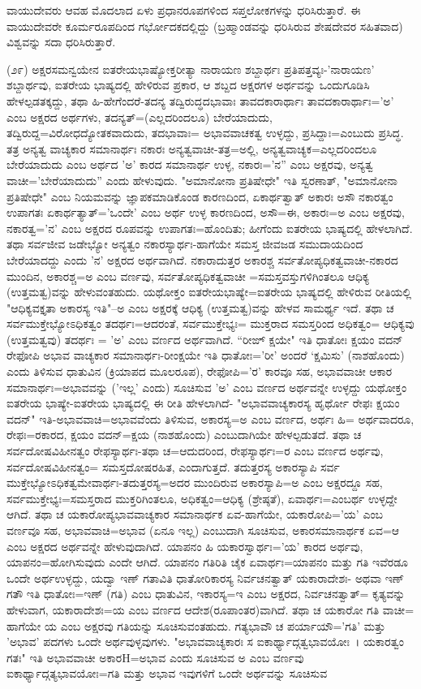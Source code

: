 ವಾಯುದೇವರು ಆವಹ ಮೊದಲಾದ ಏಳು ಪ್ರಧಾನರೂಪಗಳಿಂದ ಸಪ್ತಲೋಕಗಳನ್ನು ಧರಿಸಿರುತ್ತಾರೆ. ಈ ವಾಯುದೇವರೇ ಕೂರ್ಮರೂಪದಿಂದ ಗರ್ಭೋದಕದಲ್ಲಿದ್ದು (ಬ್ರಹ್ಮಾಂಡವನ್ನು ಧರಿಸಿರುವ ಶೇಷದೇವರ ಸಹಿತವಾದ) ವಿಶ್ವವನ್ನು ಸದಾ ಧರಿಸಿರುತ್ತಾರೆ.

(೨೯) ಅಕ್ಷರಸಮನ್ವಯೇನ ಐತರೇಯಭಾಷ್ಯೋಕ್ತರೀತ್ಯಾ ನಾರಾಯಣ ಶಬ್ದಾರ್ಥಃ ಪ್ರತಿಪತ್ತವ್ಯಃ-'ನಾರಾಯಣ' ಶಬ್ದಾರ್ಥವು, ಐತರೇಯ ಭಾಷ್ಯದಲ್ಲಿ ಹೇಳಿರುವ ಪ್ರಕಾರ, ಆ ಶಬ್ದದ ಅಕ್ಷರಗಳ ಅರ್ಥವನ್ನು ಒಂದುಗೂಡಿಸಿ ಹೇಳಲ್ಪಡತಕ್ಕದ್ದು, ತಥಾ ಹಿ-ಹೇಗೆಂದರೆ-ತದನ್ಯ ತದ್ವಿರುದ್ಧದಭಾವಾಃ ತಾವದಕಾರಾರ್ಥಾಃ ತಾವದಕಾರಾರ್ಥಾಃ='ಅ' ಎಂಬ ಅಕ್ಷರದ ಅರ್ಥಗಳು, ತದನ್ಯತ್=(ಎಲ್ಲದರಿಂದಲೂ) ಬೇರೆಯಾದುದು, ತದ್ವಿರುದ್ದ=ವಿರೋಧದ್ಯೋತಕವಾದುದು, ತದಭಾವಾಃ= ಅಭಾವವಾಚಕತ್ವ ಉಳ್ಳದ್ದು, ಪ್ರಸಿದ್ದಾಃ=ಎಂಬುದು ಪ್ರಸಿದ್ಧ. ತತ್ರ ಅನ್ಯತ್ವ ವಾಚ್ಯಕಾರ ಸಮಾನಾರ್ಥಃ ನಕಾರಃ ಅನ್ಯತ್ವವಾಚೀ-ತತ್ರ=ಅಲ್ಲಿ, ಅನ್ಯತ್ವವಾಚ್ಯಕ=ಎಲ್ಲದರಿಂದಲೂ ಬೇರೆಯಾದುದು ಎಂಬ ಅರ್ಥದ 'ಅ' ಕಾರದ ಸಮಾನಾರ್ಥ ಉಳ್ಳ, ನಕಾರಃ='ನ” ಎಂಬ ಅಕ್ಷರವು, ಅನ್ಯತ್ವ ವಾಚೀ='ಬೇರೆಯಾದುದು'' ಎಂದು ಹೇಳುವುದು. "ಅಮಾನೋನಾ ಪ್ರತಿಷೇಧೇ" ಇತಿ ಸ್ವರಣಾತ್, "ಅಮಾನೋನಾ ಪ್ರತಿಷೇಧೇ" ಎಂಬ ನಿಯಮವನ್ನು ಜ್ಞಾಪಕಮಾಡಿಕೊಂಡ ಕಾರಣದಿಂದ, ಏಕಾರ್ಥತ್ವಾತ್ ಅಕಾರಃ ಅಸೌ ನಕಾರತ್ವಂ ಉಪಾಗತಃ ಏಕಾರ್ಥತ್ಯಾತ್='ಒಂದೇ' ಎಂಬ ಅರ್ಥ ಉಳ್ಳ ಕಾರಣದಿಂದ, ಅಸೌ=ಈ, ಅಕಾರಃ=ಅ ಎಂಬ ಅಕ್ಷರವು, ನಕಾರತ್ವ='ನ' ಎಂಬ ಅಕ್ಷರದ ರೂಪವನ್ನು ಉಪಾಗತಃ=ಹೊಂದಿತು; ಹೀಗೆಂದು ಐತರೇಯ ಭಾಷ್ಯದಲ್ಲಿ ಹೇಳಲಾಗಿದೆ. ತಥಾ ಸರ್ವಜೀವ ಜಡೇಭ್ಯೋ ಅನ್ಯತ್ವಂ ನಕಾರಸ್ಯಾರ್ಥಃ-ಹಾಗೆಯೇ ಸಮಸ್ತ ಜೀವಜಡ ಸಮುದಾಯದಿಂದ ಬೇರೆಯಾದದ್ದು ಎಂದು 'ನ' ಅಕ್ಷರದ ಅರ್ಥವಾಗಿದೆ. ನಕಾರಾದುತ್ತರ ಅಕಾರಶ್ಚ ಸರ್ವತೋಪ್ಯಧಿಕತ್ವವಾಚೀ-ನಕಾರದ ಮುಂದಿನ, ಅಕಾರಶ್ಚ=ಅ ಎಂಬ ವರ್ಣವು, ಸರ್ವತೋಪ್ಯಧಿಕತ್ವವಾಚೀ =ಸಮಸ್ತವಸ್ತುಗಳಿಗಿಂತಲೂ ಆಧಿಕ್ಯ (ಉತ್ತಮತ್ವ)ವನ್ನು ಹೇಳುವಂತಹುದು. ಯಥೋಕ್ತಂ ಐತರೇಯಭಾಷ್ಯೇ=ಐತರೇಯ ಭಾಷ್ಯದಲ್ಲಿ ಹೇಳಿರುವ ರೀತಿಯಲ್ಲಿ "ಆಧಿಕ್ಯವಕ್ತೃತಾ ಅಕಾರಸ್ಯ ಇತಿ"–ಅ ಎಂಬ ಅಕ್ಷರಕ್ಕೆ ಆಧಿಕ್ಯ (ಉತ್ತಮತ್ವ)ವನ್ನು ಹೇಳವ ಸಾಮರ್ಥ್ಯ ಇದೆ. ತಥಾ ಚ ಸರ್ವಮುಕ್ತೇಭ್ಯೋಽಧಿಕತ್ವಂ ತದರ್ಥಃ=ಆದರಂತೆ, ಸರ್ವಮುಕ್ತೇಭ್ಯಃ= ಮುಕ್ತರಾದ ಸಮಸ್ತರಿಂದ ಅಧಿಕತ್ವಂ= ಆಧಿಕ್ಯವು (ಉತ್ತಮತ್ವವು) ತದರ್ಥಃ = 'ಅ' ಎಂಬ ವರ್ಣದ ಅರ್ಥವಾಗಿದೆ. “ರೀಙ್ ಕ್ಷಯೇ" ಇತಿ ಧಾತೋಃ ಕ್ಷಯಂ ವದನ್ ರೇಫೋಪಿ ಅಭಾವ ವಾಚ್ಯಕಾರ ಸಮಾನಾರ್ಥಃ-ರೀಂಕ್ಷಯೇ ಇತಿ ಧಾತೋಃ='ರೀ' ಅಂದರೆ `ಕ್ಷಮಿಸು' (ನಾಶಹೊಂದು) ಎಂದು ತಿಳಿಸುವ ಧಾತುವಿನ (ಕ್ರಿಯಾಪದ ಮೂಲರೂಪ), ರೇಫೋಪಿ='ರ' ಕಾರವೂ ಸಹ, ಅಭಾವವಾಚೀ ಆಕಾರ ಸಮಾನಾರ್ಥಃ=ಅಭಾವವನ್ನು ('ಇಲ್ಲ' ಎಂದು) ಸೂಚಿಸುವ 'ಅ' ಎಂಬ ವರ್ಣದ ಅರ್ಥವನ್ನೇ ಉಳ್ಳದ್ದು ಯಥೋಕ್ತಂ ಐತರೇಯ ಭಾಷ್ಯೇ-ಐತರೇಯ ಭಾಷ್ಯದಲ್ಲಿ ಈ ರೀತಿ ಹೇಳಲಾಗಿದೆ- "ಅಭಾವವಾಚ್ಯಕಾರಸ್ಯ ಹೃರ್ಥೋ ರೇಫಃ ಕ್ಷಯಂ ವದನ್" ಇತಿ-ಅಭಾವವಾಚಿ=ಅಭಾವವೆಂದು ತಿಳಿಸುವ, ಅಕಾರಸ್ಯ=ಅ ಎಂಬ ವರ್ಣದ, ಅರ್ಥಃ ಹಿ= ಅರ್ಥವಾದರೂ, ರೇಫಃ=ರಕಾರದ, ಕ್ಷಯಂ ವದನ್=ಕ್ಷಯ (ನಾಶಹೊಂದು) ಎಂಬುದಾಗಿಯೇ ಹೇಳಲ್ಪಡುತದೆ. ತಥಾ ಚ ಸರ್ವದೋಷವಿಹೀನತ್ವಂ ರೇಫಸ್ಯಾರ್ಥಃ-ತಥಾ ಚ=ಆದುದರಿಂದ, ರೇಫಸ್ಯಾರ್ಥಃ=ರ ಎಂಬ ವರ್ಣದ ಅರ್ಥವು, ಸರ್ವದೋಷವಿಹೀನತ್ವಂ= ಸಮಸ್ತದೋಷರಹಿತ, ಎಂದಾಗುತ್ತದೆ. ತದುತ್ತರಸ್ಯ ಅಕಾರಸ್ಯಾಪಿ ಸರ್ವ ಮುಕ್ತೇಭ್ಯೋಽಧಿಕತ್ವಮೇವಾರ್ಥಃ-ತದುತ್ತರಸ್ಯ=ಅದರ ಮುಂದಿರುವ ಅಕಾರಸ್ಯಾಪಿ=ಅ ಎಂಬ ಅಕ್ಷರದ್ದೂ ಸಹ, ಸರ್ವಮುಕ್ತೇಭ್ಯಃ=ಸಮಸ್ತರಾದ ಮುಕ್ತರಿಗಿಂತಲೂ, ಅಧಿಕತ್ವಂ=ಆಧಿಕ್ಯ (ಶ್ರೇಷ್ಠತೆ), ಏವಾರ್ಥಃ=ಎಂಬರ್ಥ ಉಳ್ಳದ್ದೇ ಆಗಿದೆ. ತಥಾ ಚ ಯಕಾರೋಪ್ಯಭಾವವಾಚ್ಯಕಾರ ಸಮಾನಾರ್ಥಕ ಏವ-ಹಾಗೆಯೇ, ಯಕಾರೋಪಿ='ಯ' ಎಂಬ ವರ್ಣವೂ ಸಹ, ಅಭಾವವಾಚಿ=ಅಭಾವ (ಏನೂ ಇಲ್ಲ) ಎಂಬುದಾಗಿ ಸೂಚಿಸುವ, ಅಕಾರಸಮಾನಾರ್ಥಕ ಏವ=ಆ ಎಂಬ ಅಕ್ಷರದ ಅರ್ಥವನ್ನೇ ಹೇಳುವುದಾಗಿದೆ. ಯಾಪನಂ ಹಿ ಯಕಾರಸ್ವಾರ್ಥಃ='ಯ' ಕಾರದ ಅರ್ಥವು, ಯಾಪನಂ=ಹೋಗಿಸುವುದು ಎಂದೇ ಆಗಿದೆ. ಯಾಪನಂ ಗತಿರಿತಿ ಚೈಕ ಏವಾರ್ಥಃ=ಯಾಪನಂ ಮತ್ತು ಗತಿ ಇವೆರಡೂ ಒಂದೇ ಅರ್ಥಉಳ್ಳದ್ದು, ಯದ್ವಾ ಇಣ್ ಗತಾವಿತಿ ಧಾತೋರಿಕಾರಸ್ಯ ನಿರ್ವಚನತ್ವಾತ್ ಯಕಾರಾದೇಶಃ- ಅಥವಾ ಇಣ್ ಗತೌ ಇತಿ ಧಾತೋಃ=ಇಣ್ (ಗತಿ) ಎಂಬ ಧಾತುವಿನ, ಇಕಾರಸ್ಯ=ಇ ಎಂಬ ಅಕ್ಷರದ, ನಿರ್ವಚನತ್ವಾತ್= ಕೃತ್ಯವನ್ನು ಹೇಳುವಾಗ, ಯಕಾರಾದೇಶಃ=ಯ ಎಂಬ ವರ್ಣದ ಆದೇಶ(ರೂಪಾಂತರ)ವಾಗಿದೆ. ತಥಾ ಚ ಯಕಾರೋ ಗತಿ ವಾಚೀ= ಹಾಗೆಯೇ ಯ ಎಂಬ ಅಕ್ಷರವು ಗತಿಯನ್ನು ಸೂಚಿಸುವಂತಹುದು. ಗತ್ಯಭಾವೌ ಚ ಪರ್ಯಾಯೌ='ಗತಿ' ಮತ್ತು 'ಅಭಾವ' ಪದಗಳು ಒಂದೇ ಅರ್ಥವುಳ್ಳವುಗಳು. "ಅಭಾವವಾಚ್ಯಕಾರಃ ಸ ಐಕಾರ್ಥ್ಯಾದ್ಗತ್ವಭಾವಯೋಃ~। ಯಕಾರತ್ವಂ ಗತಃ" ಇತಿ ಅಭಾವವಾಚೀ ಅಕಾರH=ಅಭಾವ ಎಂದು ಸೂಚಿಸುವ ಅ ಎಂಬ ವರ್ಣವು ಐಕಾರ್ಥ್ಯಾದ್ಗತ್ಯಭಾವಯೋಃ=ಗತಿ ಮತ್ತು ಅಭಾವ ಇವುಗಳಿಗೆ ಒಂದೇ ಅರ್ಥವನ್ನು ಸೂಚಿಸುವ 